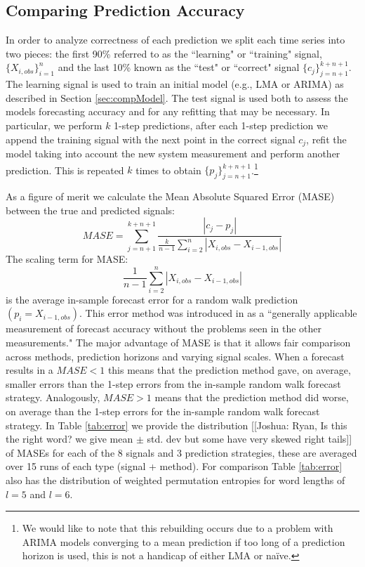 \documentclass{article}
\begin{document}
\subsection{Comparing Prediction Accuracy}
In order to analyze correctness of each prediction we split each time series into two pieces: the first 90\% referred to as the ``learning" or ``training" signal, $\{X_{i,obs}\}_{i=1}^{n}$ and the last 10\% known as the ``test" or ``correct" signal $\{c_j\}_{j=n+1}^{k+n+1}$. The learning signal is used to train an initial model (e.g., LMA or ARIMA) as described in Section \ref{sec:compModel}. The test signal is used both to assess the models forecasting accuracy and for any refitting that may be necessary. In particular, we perform $k$ 1-step predictions, after each 1-step prediction we append the training signal with the next point in the correct signal $c_j$, refit the model taking into account the new system measurement and perform another prediction. This is repeated $k$ times to obtain $\{p_j\}_{j=n+1}^{k+n+1}$.\footnote{We would like to note that this rebuilding occurs due to a problem with ARIMA models converging to a mean prediction if too long of a prediction horizon is used, this is not a handicap of either LMA or na\"ive.}

As a figure of merit we calculate the Mean Absolute Squared Error (MASE)\cite{MASE} between the true and predicted signals: 
$$MASE = \sum_{j=n+1}^{k+n+1}\frac{|c_j-p_j| }{\frac{k}{n-1}\sum^n_{i=2}|X_{i,obs}-X_{i-1,obs}|}$$
The scaling term for MASE:
$$\frac{1}{n-1}\sum^n_{i=2}|X_{i,obs}-X_{i-1,obs}|$$ 
is the average in-sample forecast error for a random walk prediction $(p_i=X_{i-1,obs})$. This error method was introduced in \cite{MASE} as a ``generally applicable measurement of forecast accuracy without the problems seen in the other measurements." The major advantage of MASE is that it allows fair comparison across methods, prediction horizons and varying signal scales. When a forecast results in a $MASE<1$ this means that the prediction method gave, on average, smaller errors than the 1-step errors from the in-sample random walk forecast strategy. Analogously, $MASE>1$ means that the prediction method did worse, on average than the 1-step errors for the in-sample random walk forecast strategy. In Table \ref{tab:error} we provide the distribution [[Joshua: Ryan, Is this the right word? we give mean $\pm$ std. dev but some have very skewed right tails]]  of MASEs for each of the 8 signals and 3 prediction strategies, these are averaged over 15 runs of each type (signal + method). For comparison Table \ref{tab:error} also has the distribution of weighted permutation entropies for word lengths of $l=5$ and $l=6$.
\end{document}

